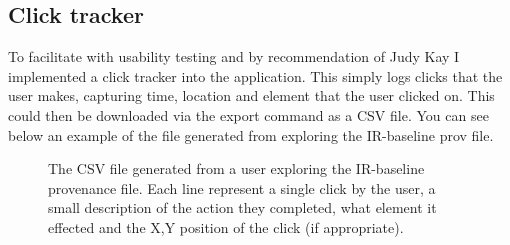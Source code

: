 \subsection{Click tracker}
\label{sec:click_tracker}

To facilitate with usability testing and by recommendation of Judy Kay I implemented a click tracker into the application. This simply logs clicks that the user makes, capturing time, location and element that the user clicked on. This could then be downloaded via the export command as a CSV file.  You can see below an example of the file generated from exploring the IR-baseline prov file.


\begin{figure}[h]
	\centering
	
	\caption{The CSV file generated from a user exploring the IR-baseline provenance file. Each line represent a single click by the user, a small description of the action they completed, what element it effected and the X,Y position of the click (if appropriate).}
	\label{fig:clickfile}
\end{figure}
